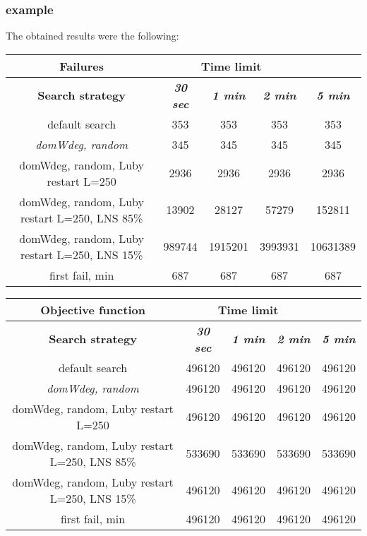 \subsubsection{example}
The obtained results were the following:
{
\renewcommand{\arraystretch}{2}
\begin{longtable}[h]{| c | c | c | c | c |}
    \hline
    \textbf{Failures} & \multicolumn{3}{c}{Time limit} & \\
    \hline
    \textbf{Search strategy} & \textbf{\textit{30 sec}} & \textbf{\textit{1 min}} & \textbf{\textit{2 min}} & \textbf{\textit{5 min}} \\
    \hline
    \endhead
    default search                                &    353 &     353 &     353 &      353 \\
    \hline
    \textit{domWdeg, random}                      &    345 &     345 &     345 &      345 \\
    \hline
    domWdeg, random, Luby restart L=250           &   2936 &    2936 &    2936 &     2936 \\
    \hline
    domWdeg, random, Luby restart L=250, LNS 85\% &  13902 &   28127 &   57279 &   152811 \\
    \hline
    domWdeg, random, Luby restart L=250, LNS 15\% & 989744 & 1915201 & 3993931 & 10631389 \\
    \hline
    first fail, min                               &    687 &     687 &     687 &      687 \\
    \hline
\end{longtable}
}

{
\renewcommand{\arraystretch}{2}
\begin{longtable}[h]{| c | c | c | c | c |}
    \hline
    \textbf{Objective function} & \multicolumn{3}{c}{Time limit} & \\
    \hline
    \textbf{Search strategy} & \textbf{\textit{30 sec}} & \textbf{\textit{1 min}} & \textbf{\textit{2 min}} & \textbf{\textit{5 min}} \\
    \hline
    \endhead
    default search                                & 496120 & 496120 & 496120 & 496120 \\
    \hline
    \textit{domWdeg, random}                      & 496120 & 496120 & 496120 & 496120 \\
    \hline
    domWdeg, random, Luby restart L=250           & 496120 & 496120 & 496120 & 496120 \\
    \hline
    domWdeg, random, Luby restart L=250, LNS 85\% & 533690 & 533690 & 533690 & 533690 \\
    \hline
    domWdeg, random, Luby restart L=250, LNS 15\% & 496120 & 496120 & 496120 & 496120 \\
    \hline
    first fail, min                               & 496120 & 496120 & 496120 & 496120 \\
    \hline
\end{longtable}
}

